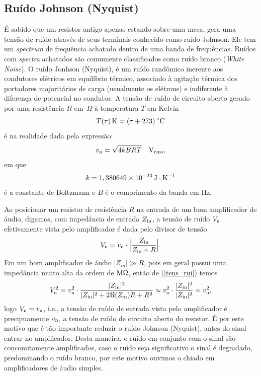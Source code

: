 \documentclass[12pt, a4paper, leqno, twoside]{book}
\def\ohm{\,\Omega}
\def\[{\begin{equation}}
\def\]{\end{equation}}
\begin{document}
  \subsection{Ru\'ido Johnson (Nyquist)}
  \'E sabido que um resistor antigo apenas estando sobre uma mesa, gera uma tens\~ao de ru\'ido atrav\'es de seus terminais conhecido como ru\'ido Johnson. Ele tem um {\it spectrum} de frequ\^encia achatado dentro de uma banda de frequ\^encias. Ru\'idos com {\it spectra} achatados s\~ao comumente classificados como ru\'ido branco ({\it White Noise}\/). O ru\'ido Jonhson (Nyquist), \'e um ru\'ido rand\^omico inerente aos condutores el\'etricos em equil\'ibrio t\'ermico, associado \`a agita\c c\~ao t\'ermica dos portadores majorit\'arios de carga (usualmente os el\'etrons) e indiferente \`a diferen\c ca de potencial no condutor. A tens\~ao de ru\'ido de circuito aberto gerado por uma resist\^encia $R$ em $\ohm$ \`a temperatura $T$ em Kelvin 
  \[ 
    T(\tau)\,{\rm K}=(\tau+273)\,^\circ{\rm C}
  \]
  \'e na realidade dada pela express\~ao:
  \[
    v_{\rm n}=\sqrt{4kBRT}\quad{\rm V_{rms}},
  \]
  em que 
  \[
    k=1,380649\times10^{-23}\,{\rm J}\cdot{\rm K}^{-1}
  \]
  \'e a constante de Boltzmann e $B$ \'e o comprimento da banda em Hz.

  Ao posicionar um resistor de resist\^encia $R$ na entrada de um bom amplificador de \'audio, digamos, com imped\^ancia de entrada $Z_{\rm in}$, a tens\~ao de ru\'ido $V_{\rm n}$ efetivamente vista pelo amplificador \'e dada pelo divisor de tens\~ao
  \[
    V_{\rm n}=v_{\rm n}\cdot\Bigl|{Z_{\rm in}\over Z_{\rm in}+R}\Bigr|.
    \label{tens_rui}
  \]
  Em um bom amplificador de \'audio $|Z_{in}|\gg R$, pois em geral possui uma imped\^ancia muito alta da ordem de ${\rm M}\Omega$, ent\~ao de (\ref{tens_rui}) temos
  \[
    V_{\rm n}^2=v_{\rm n}^2\cdot{|Z_{\rm in}|^2\over |Z_{\rm in}|^2+2\Re(Z_{\rm in})R+R^2}\approx v_{\rm n}^2\cdot{|Z_{\rm in}|^2\over |Z_{\rm in}|^2}=v_{\rm n}^2,
  \]
  logo $V_{\rm n}=v_{\rm n}$, i.e., a tens\~ao de ru\'ido de entrada vista pelo amplificador \'e precipuamente $v_{\rm n}$, a tens\~ao de ru\'ido de circuito aberto do resistor. \'E por este motivo que \'e t\~ao importante reduzir o ru\'ido Johnson (Nyquist), antes do sinal entrar no ampificador. Desta maneira, o ru\'ido em conjunto com o sinal s\~ao concomitamente amplificados, caso o ru\'ido seja significativo o sinal \'e degradado, predominando o ru\'ido branco, por este motivo ouvimos o chiado em amplificadores de \'audio simples.

  \fi
\end{document}
